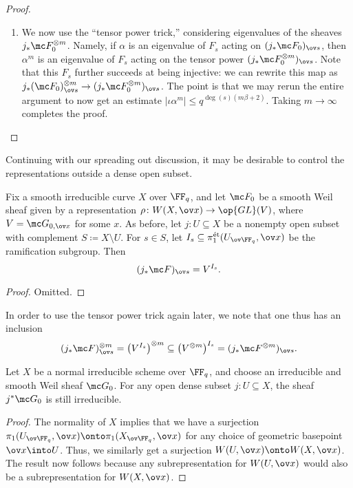 \documentclass[../notes.tex]{subfiles}
\begin{document}
\begin{proof}
\begin{enumerate}
		\item We now use the ``tensor power trick,'' considering eigenvalues of the sheaves $j_*\mc F_0^{\otimes m}$. Namely, if $\alpha$ is an eigenvalue of $F_s$ acting on $(j_*\mc F_0)_{\ov s}$, then $\alpha^m$ is an eigenvalue of $F_s$ acting on the tensor power $(j_*\mc F_0^{\otimes m})_{\ov s}$. Note that this $F_s$ further succeeds at being injective: we can rewrite this map as $j_*(\mc F_0)_{\ov s}^{\otimes m}\to (j_*\mc F^{\otimes m}_0)_{\ov s}$. The point is that we may rerun the entire argument to now get an estimate $\left|\iota\alpha^m\right|\le q^{\deg(s)(m\beta+2)}$. Taking $m\to\infty$ completes the proof.
		\qedhere
	\end{enumerate}
\end{proof}
Continuing with our spreading out discussion, it may be desirable to control the representations outside a dense open subset.
\begin{lemma}
	Fix a smooth irreducible curve $X$ over $\FF_q$, and let $\mc F_0$ be a smooth Weil sheaf given by a representation $\rho\colon W(X,\ov x)\to\op{GL}(V)$, where $V=\mc G_{0,\ov x}$ for some $x$. As before, let $j\colon U\subseteq X$ be a nonempty open subset with complement $S\coloneqq X\setminus U$. For $s\in S$, let $I_s\subseteq\pi_1^{\mathrm{\acute et}}(U_{\ov\FF_q},\ov x)$ be the ramification subgroup. Then
	\[(j_*\mc F)_{\ov s}=V^{I_s}.\]
\end{lemma}
\begin{proof}
	Omitted.
\end{proof}
\begin{remark}
	In order to use the tensor power trick again later, we note that one thus has an inclusion
	\[(j_*\mc F)_{\ov s}^{\otimes m}=\left(V^{I_s}\right)^{\otimes m}\subseteq\left(V^{\otimes m}\right)^{I_s}=(j_*\mc F^{\otimes m})_{\ov s}.\]
\end{remark}
\begin{lemma} \label{lem:shrinking-stays-irred}
	Let $X$ be a normal irreducible scheme over $\FF_q$, and choose an irreducible and smooth Weil sheaf $\mc G_0$. For any open dense subset $j\colon U\subseteq X$, the sheaf $j^*\mc G_0$ is still irreducible.
\end{lemma}
\begin{proof}
	The normality of $X$ implies that we have a surjection $\pi_1(U_{\ov\FF_q},\ov x)\onto\pi_1(X_{\ov\FF_q},\ov x)$ for any choice of geometric basepoint $\ov x\into U$. Thus, we similarly get a surjection $W(U,\ov x)\onto W(X,\ov x)$. The result now follows because any subrepresentation for $W(U,\ov x)$ would also be a subrepresentation for $W(X,\ov x)$.
\end{proof}
\end{document}
